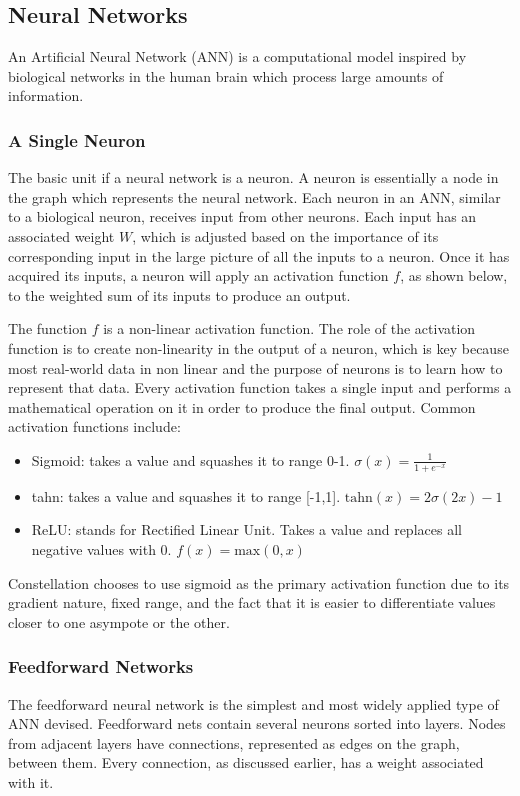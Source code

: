 \subsection{Neural Networks}
An Artificial Neural Network (ANN) is a computational model inspired by biological networks in the human brain which process large amounts of information.
\subsubsection{A Single Neuron}
The basic unit if a neural network is a neuron. A neuron is essentially a node in the graph which represents the neural network. Each neuron in an ANN, similar to a biological neuron, receives input from other neurons. Each input has an associated weight $W$, which is adjusted based on the importance of its corresponding input in the large picture of all the inputs to a neuron. Once it has acquired its inputs, a neuron will apply an activation function $f$, as shown below, to the weighted sum of its inputs to produce an output.


The function $f$ is a non-linear activation function. The role of the activation function is to create non-linearity in the output of a neuron, which is key because most real-world data in non linear and the purpose of neurons is to learn how to represent that data. Every activation function takes a single input and performs a mathematical operation on it in order to produce the final output. Common activation functions include:
\begin{itemize}
    \item Sigmoid: takes a value and squashes it to range 0-1. $\sigma(x) = \frac{1}{1+e^{-x}}$
    \item tahn: takes a value and squashes it to range [-1,1]. $\text{tahn}(x)=2\sigma(2x)-1$
    \item ReLU: stands for Rectified Linear Unit. Takes a value and replaces all negative values with 0. $f(x)=\text{max}(0,x)$
\end{itemize}

Constellation chooses to use sigmoid as the primary activation function due to its gradient nature, fixed range, and the fact that it is easier to differentiate values closer to one asympote or the other.
\subsubsection{Feedforward Networks}
The feedforward neural network is the simplest and most widely applied type of ANN devised. Feedforward nets contain several neurons sorted into layers. Nodes from adjacent layers have connections, represented as edges on the graph, between them. Every connection, as discussed earlier, has a weight associated with it. \\


